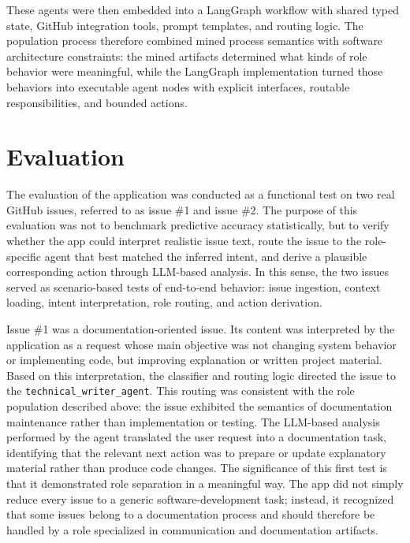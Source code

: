 \documentclass[11pt,a4paper]{article}
\begin{document}
These agents were then embedded into a LangGraph workflow with shared typed state, GitHub integration tools, prompt templates, and routing logic. The population process therefore combined mined process semantics with software architecture constraints: the mined artifacts determined what kinds of role behavior were meaningful, while the LangGraph implementation turned those behaviors into executable agent nodes with explicit interfaces, routable responsibilities, and bounded actions.

\section{Evaluation}

The evaluation of the application was conducted as a functional test on two real GitHub issues, referred to as issue \#1 and issue \#2. The purpose of this evaluation was not to benchmark predictive accuracy statistically, but to verify whether the app could interpret realistic issue text, route the issue to the role-specific agent that best matched the inferred intent, and derive a plausible corresponding action through LLM-based analysis. In this sense, the two issues served as scenario-based tests of end-to-end behavior: issue ingestion, context loading, intent interpretation, role routing, and action derivation.

Issue \#1 was a documentation-oriented issue. Its content was interpreted by the application as a request whose main objective was not changing system behavior or implementing code, but improving explanation or written project material. Based on this interpretation, the classifier and routing logic directed the issue to the \texttt{technical\_writer\_agent}. This routing was consistent with the role population described above: the issue exhibited the semantics of documentation maintenance rather than implementation or testing. The LLM-based analysis performed by the agent translated the user request into a documentation task, identifying that the relevant next action was to prepare or update explanatory material rather than produce code changes. The significance of this first test is that it demonstrated role separation in a meaningful way. The app did not simply reduce every issue to a generic software-development task; instead, it recognized that some issues belong to a documentation process and should therefore be handled by a role specialized in communication and documentation artifacts.
\end{document}
